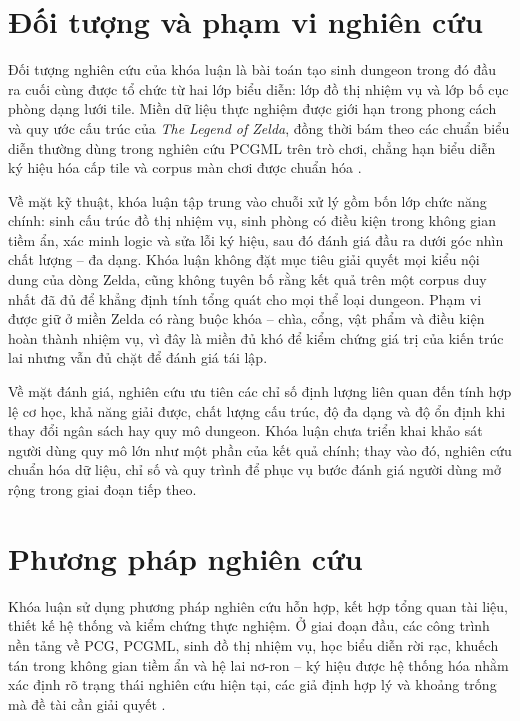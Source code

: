 \documentclass[oneside,a4paper,12pt]{extreport}
\begin{document}
\section{Đối tượng và phạm vi nghiên cứu}
Đối tượng nghiên cứu của khóa luận là bài toán tạo sinh dungeon trong đó đầu ra cuối cùng được tổ chức từ hai lớp biểu diễn: lớp đồ thị nhiệm vụ và lớp bố cục phòng dạng lưới tile. Miền dữ liệu thực nghiệm được giới hạn trong phong cách và quy ước cấu trúc của \textit{The Legend of Zelda}, đồng thời bám theo các chuẩn biểu diễn thường dùng trong nghiên cứu PCGML trên trò chơi, chẳng hạn biểu diễn ký hiệu hóa cấp tile và corpus màn chơi được chuẩn hóa \cite{summerville2016vglc,summerville2018pcgml}.

Về mặt kỹ thuật, khóa luận tập trung vào chuỗi xử lý gồm bốn lớp chức năng chính: sinh cấu trúc đồ thị nhiệm vụ, sinh phòng có điều kiện trong không gian tiềm ẩn, xác minh logic và sửa lỗi ký hiệu, sau đó đánh giá đầu ra dưới góc nhìn chất lượng -- đa dạng. Khóa luận không đặt mục tiêu giải quyết mọi kiểu nội dung của dòng Zelda, cũng không tuyên bố rằng kết quả trên một corpus duy nhất đã đủ để khẳng định tính tổng quát cho mọi thể loại dungeon. Phạm vi được giữ ở miền Zelda có ràng buộc khóa -- chìa, cổng, vật phẩm và điều kiện hoàn thành nhiệm vụ, vì đây là miền đủ khó để kiểm chứng giá trị của kiến trúc lai nhưng vẫn đủ chặt để đánh giá tái lập.

Về mặt đánh giá, nghiên cứu ưu tiên các chỉ số định lượng liên quan đến tính hợp lệ cơ học, khả năng giải được, chất lượng cấu trúc, độ đa dạng và độ ổn định khi thay đổi ngân sách hay quy mô dungeon. Khóa luận chưa triển khai khảo sát người dùng quy mô lớn như một phần của kết quả chính; thay vào đó, nghiên cứu chuẩn hóa dữ liệu, chỉ số và quy trình để phục vụ bước đánh giá người dùng mở rộng trong giai đoạn tiếp theo.

\section{Phương pháp nghiên cứu}
Khóa luận sử dụng phương pháp nghiên cứu hỗn hợp, kết hợp tổng quan tài liệu, thiết kế hệ thống và kiểm chứng thực nghiệm. Ở giai đoạn đầu, các công trình nền tảng về PCG, PCGML, sinh đồ thị nhiệm vụ, học biểu diễn rời rạc, khuếch tán trong không gian tiềm ẩn và hệ lai nơ-ron -- ký hiệu được hệ thống hóa nhằm xác định rõ trạng thái nghiên cứu hiện tại, các giả định hợp lý và khoảng trống mà đề tài cần giải quyết \cite{togelius2011pcg,summerville2018pcgml,dormans2011missionspaces,rombach2022ldm}.
\end{document}
